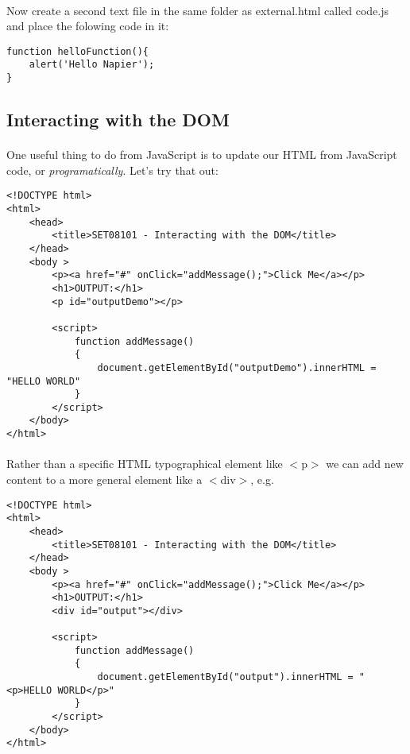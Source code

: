 \documentclass[10pt, a4paper]{article}
\begin{document}
\paragraph{} Now create a second text file in the same folder as external.html called code.js and place the folowing code in it:

\begin{lstlisting}
function helloFunction(){ 
    alert('Hello Napier'); 
}
\end{lstlisting}


\subsection{Interacting with the DOM}

\paragraph{} One useful thing to do from JavaScript is to update our HTML from JavaScript code, or \emph{programatically}. Let's try that out:

\begin{lstlisting}
<!DOCTYPE html>
<html>
    <head> 
        <title>SET08101 - Interacting with the DOM</title>
    </head>
    <body >
        <p><a href="#" onClick="addMessage();">Click Me</a></p>
        <h1>OUTPUT:</h1>
        <p id="outputDemo"></p>

        <script>
            function addMessage() 
            { 
                document.getElementById("outputDemo").innerHTML = "HELLO WORLD"
            }      
        </script>
    </body>
</html>
\end{lstlisting}

\paragraph{} Rather than a specific HTML typographical element like $<$p$>$ we can add new content to a more general element like a $<$div$>$, e.g.

\begin{lstlisting}
<!DOCTYPE html>
<html>
    <head> 
        <title>SET08101 - Interacting with the DOM</title>
    </head>
    <body >
        <p><a href="#" onClick="addMessage();">Click Me</a></p>
        <h1>OUTPUT:</h1>
        <div id="output"></div>

        <script>
            function addMessage() 
            { 
                document.getElementById("output").innerHTML = "<p>HELLO WORLD</p>"
            }      
        </script>
    </body>
</html>
\end{lstlisting}
\end{document}
